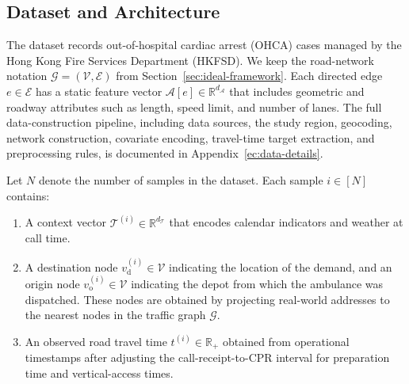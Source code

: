 \documentclass[11pt, letterpaper, oneside, reqno]{amsart}
\newcommand{\R}{\mathbb{R}}
\begin{document}
\subsection{Dataset and Architecture} \label{sec:data}

The dataset records out-of-hospital cardiac arrest (OHCA) cases managed by the Hong Kong Fire Services Department (HKFSD). We keep the road-network notation $\mathcal G=(\mathcal V,\mathcal E)$ from Section~\ref{sec:ideal-framework}. Each directed edge $e\in\mathcal E$ has a static feature vector $\mathcal A[e]\in\R^{d_{\mathcal A}}$ that includes geometric and roadway attributes such as length, speed limit, and number of lanes. The full data-construction pipeline, including data sources, the study region, geocoding, network construction, covariate encoding, travel-time target extraction, and preprocessing rules, is documented in Appendix~\ref{ec:data-details}.

Let $N$ denote the number of samples in the dataset. Each sample $i\in[N]$ contains:
\begin{enumerate}[leftmargin=7mm]
\item A context vector $\mathcal T^{(i)} \in \R^{d_{\mathcal T}}$ that encodes calendar indicators and weather at call time.
\item A destination node $v^{(i)}_{\mathrm{d}} \in \mathcal V$ indicating the location of the demand, and an origin node $v^{(i)}_{\mathrm{o}} \in \mathcal V$ indicating the depot from which the ambulance was dispatched. These nodes are obtained by projecting real-world addresses to the nearest nodes in the traffic graph $\mathcal G$.
\item An observed road travel time $t^{(i)} \in \R_+$ obtained from operational timestamps after adjusting the call-receipt-to-CPR interval for preparation time and vertical-access times.
\end{enumerate}
\end{document}
